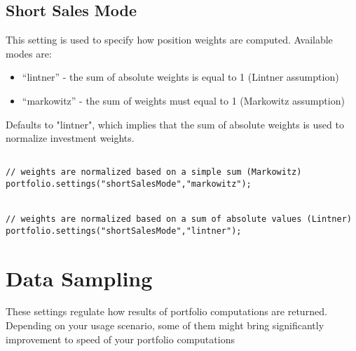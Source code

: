 \documentclass[letterpaper]{report}
\begin{document}
\subsection {Short Sales Mode}
This setting is used to specify how position weights are computed. Available modes are:
  \begin{itemize} 
\item  ``lintner'' - the sum of absolute weights is equal to 1 (Lintner
                                                                assumption)
\item ``markowitz'' - the sum of weights must equal to 1 (Markowitz
                                                          assumption)
\end{itemize}
Defaults to "lintner", which implies that the sum of absolute weights is used to normalize investment weights.

\begin{lstlisting}

// weights are normalized based on a simple sum (Markowitz)
portfolio.settings("shortSalesMode","markowitz");


// weights are normalized based on a sum of absolute values (Lintner)
portfolio.settings("shortSalesMode","lintner");

\end{lstlisting}

\section{Data Sampling}
These settings regulate how results of portfolio computations are returned. 
Depending on your usage scenario, some of them might bring significantly improvement to speed of your portfolio computations
\end{document}
